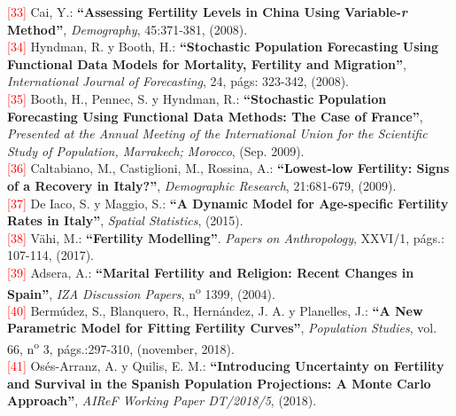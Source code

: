 \noindent \textcolor{red}{[33]} Cai, Y.: \textbf{``Assessing Fertility Levels in China Using Variable-\textit{r} Method''}, \textit{Demography}, 45:371-381, (2008).\\

\noindent \textcolor{red}{[34]} Hyndman, R. y Booth, H.: \textbf{``Stochastic Population Forecasting Using Functional Data Models for Mortality, Fertility and Migration''}, \textit{International Journal of Forecasting}, 24, págs: 323-342, (2008). \\

\noindent \textcolor{red}{[35]} Booth, H., Pennec, S. y Hyndman, R.: \textbf{``Stochastic Population Forecasting Using Functional Data Methods: The Case of France''}, \textit{Presented at the Annual Meeting of the International Union for the Scientific Study of Population, Marrakech; Morocco}, (Sep. 2009). \\

\noindent \textcolor{red}{[36]} Caltabiano, M., Castiglioni, M., Rossina, A.: \textbf{``Lowest-low Fertility: Signs of a Recovery in Italy?''}, \textit{Demographic Research}, 21:681-679, (2009).\\

\noindent \textcolor{red}{[37]} De Iaco, S. y Maggio, S.: \textbf{``A Dynamic Model for Age-specific Fertility Rates in Italy''}, \textit{Spatial Statistics}, (2015). \\

\noindent \textcolor{red}{[38]} V\"ahi, M.: \textbf{``Fertility Modelling''}. \textit{Papers on Anthropology}, XXVI/1, págs.: 107-114, (2017).\\

\noindent \textcolor{red}{[39]} Adsera, A.: \textbf{``Marital Fertility and Religion: Recent Changes in Spain''}, \textit{IZA Discussion Papers}, n\textsuperscript{o} 1399, (2004).\\

\noindent \textcolor{red}{[40]} Bermúdez, S., Blanquero, R., Hernández, J. A. y Planelles, J.: \textbf{``A New Parametric Model for Fitting Fertility Curves''}, \textit{Population Studies}, vol. 66, n\textsuperscript{o} 3, págs.:297-310, (november, 2018).\\

\noindent \textcolor{red}{[41]} Os\'es-Arranz, A. y Quilis, E. M.: \textbf{``Introducing Uncertainty on Fertility and Survival in the Spanish Population Projections: A Monte Carlo Approach''}, \textit{AIReF Working Paper DT/2018/5}, (2018).\\

